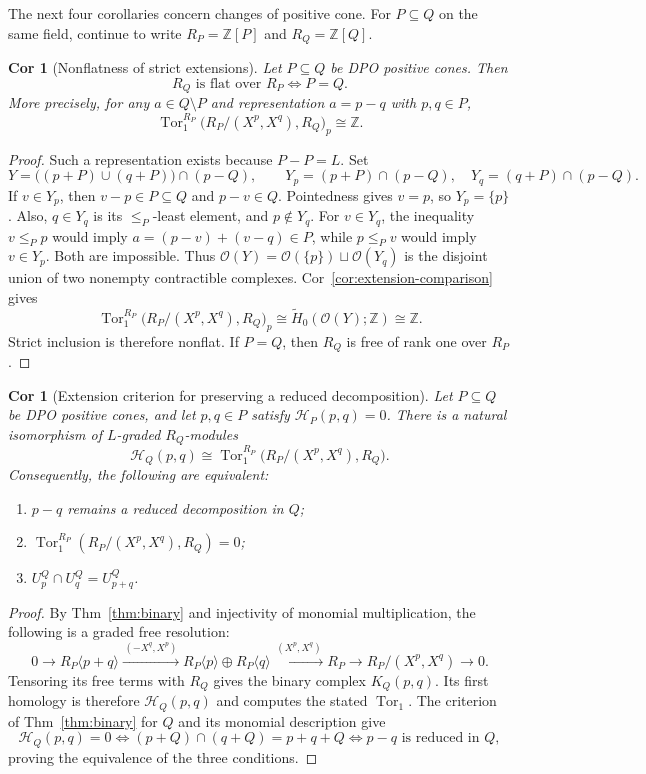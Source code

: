 \documentclass[10pt,letterpaper]{amsart}
\numberwithin{equation}{section}
\newtheorem{cor}[thm]{Cor}
\theoremstyle{definition}
\newcommand{\Z}{\mathbb Z}
\newcommand{\Tor}{\operatorname{Tor}}
\newcommand{\ord}{\mathcal O}
\newcommand{\sh}[1]{\langle #1\rangle}
\newcommand{\HH}{\mathcal H}
\begin{document}
The next four corollaries concern changes of positive cone. For $P\subseteq Q$ on the same field, continue to write $R_P=\Z[P]$ and $R_Q=\Z[Q]$.

\begin{cor}[Nonflatness of strict extensions]\label{cor:extension-nonflat}
Let $P\subseteq Q$ be DPO positive cones. Then
\[
R_Q\text{ is flat over }R_P\iff P=Q.
\]
More precisely, for any $a\in Q\setminus P$ and representation $a=p-q$ with $p,q\in P$,
\[
\Tor_1^{R_P}\bigl(R_P/(X^p,X^q),R_Q\bigr)_p\cong\Z.
\]
\end{cor}
\begin{proof}
Such a representation exists because $P-P=L$. Set
\[
Y=\bigl((p+P)\cup(q+P)\bigr)\cap(p-Q),\qquad
Y_p=(p+P)\cap(p-Q),\quad Y_q=(q+P)\cap(p-Q).
\]
If $v\in Y_p$, then $v-p\in P\subseteq Q$ and $p-v\in Q$. Pointedness gives $v=p$, so $Y_p=\{p\}$.
Also, $q\in Y_q$ is its $\le_P$-least element, and $p\notin Y_q$.
For $v\in Y_q$, the inequality $v\le_Pp$ would imply $a=(p-v)+(v-q)\in P$, while $p\le_Pv$ would imply $v\in Y_p$. Both are impossible.
Thus $\ord(Y)=\ord(\{p\})\sqcup\ord(Y_q)$ is the disjoint union of two nonempty contractible complexes. Cor~\ref{cor:extension-comparison} gives
\[
\Tor_1^{R_P}\bigl(R_P/(X^p,X^q),R_Q\bigr)_p
\cong\widetilde H_0(\ord(Y);\Z)\cong\Z.
\]
Strict inclusion is therefore nonflat. If $P=Q$, then $R_Q$ is free of rank one over $R_P$.
\end{proof}

\begin{cor}[Extension criterion for preserving a reduced decomposition]\label{cor:extension-reduced}
Let $P\subseteq Q$ be DPO positive cones, and let $p,q\in P$ satisfy $\HH_P(p,q)=0$. There is a natural isomorphism of $L$-graded $R_Q$-modules
\[
\HH_Q(p,q)\cong
\Tor_1^{R_P}\bigl(R_P/(X^p,X^q),R_Q\bigr).
\]
Consequently, the following are equivalent:
\begin{enumerate}
\item $p-q$ remains a reduced decomposition in $Q$;
\item $\Tor_1^{R_P}(R_P/(X^p,X^q),R_Q)=0$;
\item $U_p^Q\cap U_q^Q=U_{p+q}^Q$.
\end{enumerate}
\end{cor}
\begin{proof}
By Thm~\ref{thm:binary} and injectivity of monomial multiplication, the following is a graded free resolution:
\[
0\longrightarrow R_P\sh{p+q}
\xrightarrow{\,(-X^q,X^p)\,}
R_P\sh p\oplus R_P\sh q
\xrightarrow{\,(X^p,X^q)\,}R_P
\longrightarrow R_P/(X^p,X^q)\longrightarrow0.
\]
Tensoring its free terms with $R_Q$ gives the binary complex $K_Q(p,q)$. Its first homology is therefore $\HH_Q(p,q)$ and computes the stated $\Tor_1$.
The criterion of Thm~\ref{thm:binary} for $Q$ and its monomial description give
\[
\HH_Q(p,q)=0
\iff(p+Q)\cap(q+Q)=p+q+Q
\iff p-q\text{ is reduced in }Q,
\]
proving the equivalence of the three conditions.
\end{proof}
\end{document}
